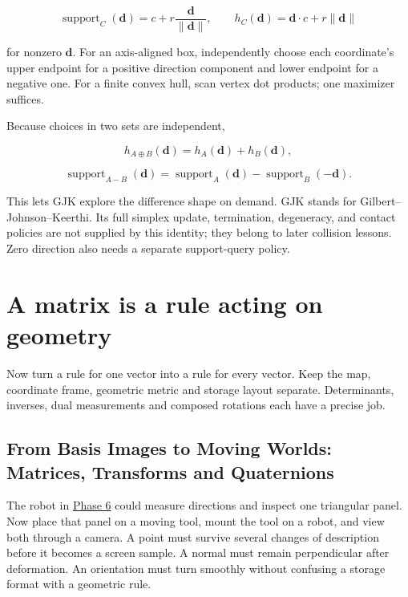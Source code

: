 \[
\operatorname{support}_C(\mathbf d)=c+r\frac{\mathbf d}{\|\mathbf d\|},
\qquad h_C(\mathbf d)=\mathbf d\cdot c+r\|\mathbf d\|
\]

for nonzero \(\mathbf d\). For an axis-aligned box, independently choose each coordinate's upper endpoint for a positive direction component and lower endpoint for a negative one. For a finite convex hull, scan vertex dot products; one maximizer suffices.

Because choices in two sets are independent,

\[
h_{A\oplus B}(\mathbf d)=h_A(\mathbf d)+h_B(\mathbf d),
\]

\[
\operatorname{support}_{A-B}(\mathbf d)
=\operatorname{support}_A(\mathbf d)-\operatorname{support}_B(-\mathbf d).
\]

This lets GJK explore the difference shape on demand. GJK stands for Gilbert--Johnson--Keerthi. Its full simplex update, termination, degeneracy, and contact policies are not supplied by this identity; they belong to later collision lessons. Zero direction also needs a separate support-query policy.

\section{A matrix is a rule acting on geometry}\label{01-foundations-i-ch018-a-matrix-is-a-rule-acting-on-geometry}

\hypertarget{01-foundations-i-ch018-a-matrix-is-a-rule-acting-on-geometry}{}

Now turn a rule for one vector into a rule for every vector. Keep the map, coordinate frame, geometric metric and storage layout separate. Determinants, inverses, dual measurements and composed rotations each have a precise job.

\subsection{From Basis Images to Moving Worlds: Matrices, Transforms and Quaternions}\label{01-foundations-i-ch018-from-basis-images-to-moving-worlds-matrices-transforms-and-quaternions}

\hypertarget{01-foundations-i-ch018-from-basis-images-to-moving-worlds-matrices-transforms-and-quaternions}{}

The robot in \hyperref[01-foundations-i-ch017-the-panel-gives-us-a-reason-to-learn]{Phase 6} could measure directions and inspect one triangular panel. Now place that panel on a moving tool, mount the tool on a robot, and view both through a camera. A point must survive several changes of description before it becomes a screen sample. A normal must remain perpendicular after deformation. An orientation must turn smoothly without confusing a storage format with a geometric rule.

